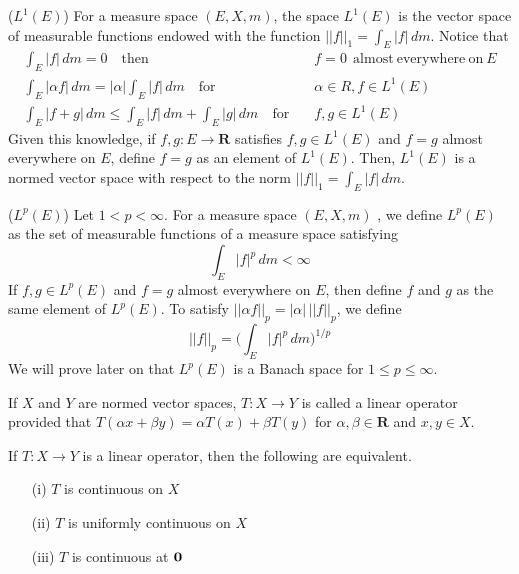 \vspace{2ex}
\begin{defi}
($L^{1}(E)$) For a measure space $(E,X,m)$, the space $L^{1}(E)$ is the vector space of measurable functions endowed with the function $||f||_{1}=\int _{E}|f|\,dm$. Notice that 
\begin{align*}
\int _{E}|f|\,d m=0\quad \mathrm{then}&\quad f=0\ \mathrm{\ almost\ everywhere\ on\ }E\\
\int _{E}|\alpha f|\,dm=|\alpha |\int _{E}|f|\,d m\quad\mathrm{for}&\quad\alpha \in R,f\in L^{1}(E)\\
\int _{E}|f+g|\,d m\leq \int _{E}|f|\,d m+\int _{E}|g|\,d m\quad\mathrm{for}&\quad f,g\in L^{1}(E)
\end{align*}
Given this knowledge, if $f,g:E\rightarrow {\bm R}$ satisfies $f,g\in L^{1}(E)$ and $f=g$ almost everywhere on $E$, define $f=g$ as an element of $L^{1}(E)$. Then, $L^{1}(E)$ is a normed vector space with respect to the norm $||f||_{1}=\int _{E}|f|\,d m$.
\end{defi}
\vspace{2ex}
\begin{defi}
($L^{p}(E)$) Let $1< p<\infty $. For a measure space $(E,X,m)$ , we define $L^{p}(E)$ as the set of measurable functions of a measure space satisfying 
\[\int _{E}|f|^{p}\,dm<\infty \]
If $f,g\in L^{p}(E)$ and $f=g$ almost everywhere on $E$, then define $f$ and $g$  as the same element of $L^{p}(E)$. To satisfy $||\alpha f||_{p}=|\alpha |\,||f||_{p}$, we define
\[||f||_{p}=\Big(\int _{E}|f|^{p}\, dm\Big)^{1/p}\]
We will prove later on that $L^{p}(E)$ is a Banach space for $1\leq p\leq \infty $.
\end{defi}
\vspace{2ex}
\begin{defi}
If $X$ and $Y$ are normed vector spaces, $T:X\rightarrow Y$ is called a linear operator provided that $T(\alpha x+\beta y)=\alpha T(x)+\beta T(y)$ for $\alpha ,\beta \in {\bm R}$ and $x,y\in X$. 
\end{defi}
\vspace{2ex}
\begin{thm}
If $T:X\rightarrow Y$ is a linear operator, then the following are equivalent. 
\begin{itemize}
\item[(i)] $T$ is continuous on $X$
\item[(ii)] $T$ is uniformly continuous on $X$
\item[(iii)] $T$ is continuous at ${\bf 0}$
\end{itemize}
\end{thm}
